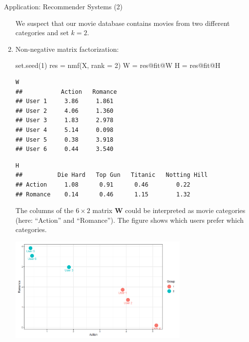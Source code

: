 \begin{vbframe}{Application: Recommender Systems (2)}
\begin{enumerate}
\lz

We suspect that our movie database contains movies from two different categories and set $k=2$.

\lz

\item Non-negative matrix factorization:
\vspace{0.3cm}
\footnotesize

\begin{verbbox}
set.seed(1)
res = nmf(X, rank = 2)
W = res@fit@W
H = res@fit@H
\end{verbbox}
\col

\framebreak







\begin{verbatim}
W
##           Action   Romance
## User 1     3.86     1.861
## User 2     4.06     1.360
## User 3     1.83     2.978
## User 4     5.14     0.098
## User 5     0.38     3.918
## User 6     0.44     3.540
\end{verbatim}

\lz 

\begin{verbatim}
H
##          Die Hard   Top Gun   Titanic   Notting Hill
## Action     1.08      0.91      0.46        0.22
## Romance    0.14      0.46      1.15        1.32
\end{verbatim}

\framebreak

\normalsize
The columns of the $6 \times 2$ matrix $\mathbf{W}$ could be interpreted as movie categories (here: \enquote{Action} and \enquote{Romance}). The figure shows which users prefer which categories.

\lz

\begin{center}
	\includegraphics[width = 0.7\textwidth]{figure_man/recom-system-1.png}
\end{center}


\end{enumerate}
\end{vbframe}
